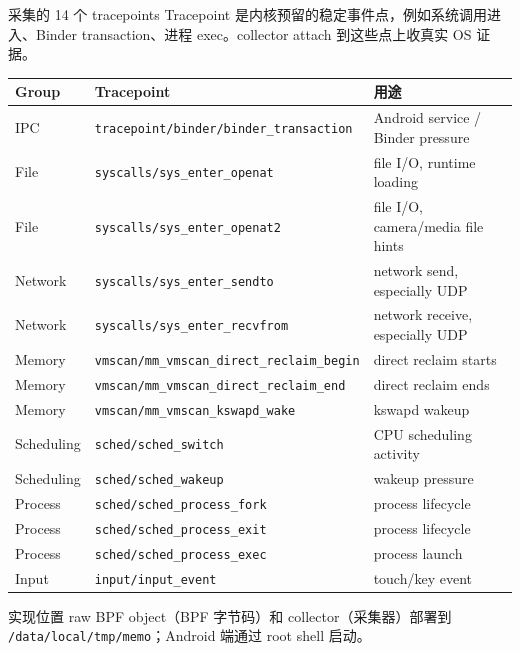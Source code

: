 \documentclass[UTF8,aspectratio=169,10pt]{ctexbeamer}
\newcommand{\code}[1]{\texttt{\small #1}}
\begin{document}
\begin{frame}{采集的 14 个 tracepoints}
  \scriptsize
  Tracepoint 是内核预留的稳定事件点，例如系统调用进入、Binder transaction、进程 exec。collector attach 到这些点上收真实 OS 证据。
  \vspace{0.35em}
  \begin{tabular}{lll}
    \toprule
    Group & Tracepoint & 用途 \\
    \midrule
    IPC & \code{tracepoint/binder/binder\_transaction} & Android service / Binder pressure \\
    File & \code{syscalls/sys\_enter\_openat} & file I/O, runtime loading \\
    File & \code{syscalls/sys\_enter\_openat2} & file I/O, camera/media file hints \\
    Network & \code{syscalls/sys\_enter\_sendto} & network send, especially UDP \\
    Network & \code{syscalls/sys\_enter\_recvfrom} & network receive, especially UDP \\
    Memory & \code{vmscan/mm\_vmscan\_direct\_reclaim\_begin} & direct reclaim starts \\
    Memory & \code{vmscan/mm\_vmscan\_direct\_reclaim\_end} & direct reclaim ends \\
    Memory & \code{vmscan/mm\_vmscan\_kswapd\_wake} & kswapd wakeup \\
    Scheduling & \code{sched/sched\_switch} & CPU scheduling activity \\
    Scheduling & \code{sched/sched\_wakeup} & wakeup pressure \\
    Process & \code{sched/sched\_process\_fork} & process lifecycle \\
    Process & \code{sched/sched\_process\_exit} & process lifecycle \\
    Process & \code{sched/sched\_process\_exec} & process launch \\
    Input & \code{input/input\_event} & touch/key event \\
    \bottomrule
  \end{tabular}
  \vspace{0.5em}
  \begin{block}{实现位置}
    raw BPF object（BPF 字节码）和 collector（采集器）部署到 \code{/data/local/tmp/memo}；Android 端通过 root shell 启动。
  \end{block}
\end{frame}
\end{document}
